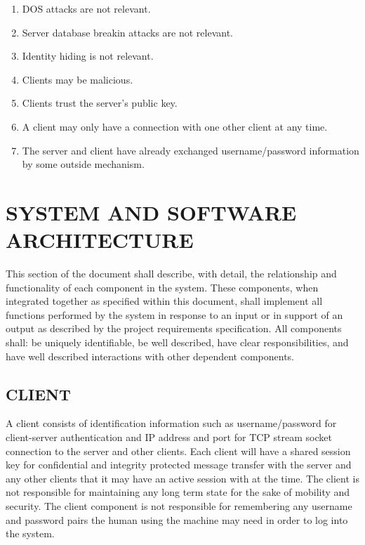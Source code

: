 \documentclass[twoside,letterpaper]{article}
\begin{document}
\begin{enumerate}
\item DOS attacks are not relevant.
\item Server database breakin attacks are not relevant.
\item Identity hiding is not relevant.
\item Clients may be malicious.
\item Clients trust the server's public key.
\item A client may only have a connection with one other client at any time.
\item The server and client have already exchanged username/password information by some outside 
mechanism.
\end{enumerate}

\bigskip

\section{SYSTEM AND SOFTWARE
ARCHITECTURE}
This section of the document shall describe, with detail, the relationship
and functionality of each component in the system. These components, when
integrated together as specified within this document, shall implement
all functions performed by the system in response to an input or in
support of an output as described by the project requirements specification.
All components shall: be uniquely identifiable, be well described,
have clear responsibilities, and have well described interactions with other dependent components.

\bigskip

\subsection{CLIENT}
A client consists of identification information such as username/password for client-server authentication and IP
address and port for TCP stream socket connection to the server and other clients. 
Each client will have a shared session key for confidential and integrity protected message transfer with the
server and any other clients that it may have an active session with at the time. The client is not responsible for
maintaining any long term state for the sake of mobility and security. The client component is not responsible for
remembering any username and password pairs the human using the machine may need in order to log into the
system.

\bigskip
\end{document}
